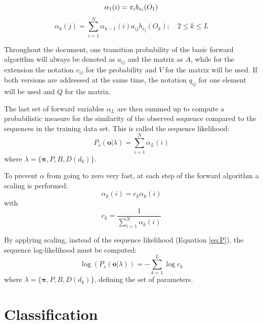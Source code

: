 \documentclass[mscthesis]{usiinfthesis}
\begin{document}
\begin{equation}
    \label{eq:forward_init_basic}
    \alpha_1(i) = \pi_{i}b_{s_i}(O_1) \\
\end{equation}
\begin{equation}
    \label{eq:forward_basic}
    \alpha_k(j) = \sum_{i=1}^{N} \alpha_{k-1}(i) a_{ij} b_{s_j}(O_k);
    \quad 2 \leq k \leq L
\end{equation}

Throughout the document, one transition probability of the basic forward
algorithm will always be denoted as $a_{ij}$ and the matrix as $A$, while for
the extension the notation $v_{ij}$ for the probability and $V$ for the matrix
will be used. If both versions are addressed at the same time, the notation
$q_{ij}$ for one element will be used and $Q$ for the matrix.

The last set of forward variables $\alpha_L$ are then summed up to compute
a probabilistic measure for the similarity of the observed sequence compared to
the sequences in the training data set. This is called the sequence likelihood:
\begin{equation}
    \label{eq:P}
    P_s(\boldsymbol{o}|\lambda) = \sum\limits_{i=1}^{N} \alpha_L(i)
\end{equation}
where $ \lambda = \{\boldsymbol{\pi}, P, B, D(d_k) \} $.

To prevent $\alpha$ from going to zero very fast, at each step of the forward
algorithm a scaling is performed:
\begin{equation}
    \label{eq:scaled}
    \alpha_k(i) = c_k \alpha_k(i)
\end{equation}
with
\begin{equation}
    \label{eq:scaling_factor}
    c_k = \frac{1}{\sum\limits_{i=1}^{N} \alpha_k(i)}
\end{equation}

By applying scaling, instead of the sequence likelihood (Equation \ref{eq:P}),
the sequence log-likelihood must be computed:
\begin{equation}
    \label{eq:Plog}
    \log(P_s(\boldsymbol{o}|\lambda)) = -\sum\limits_{k=1}^{L} \log c_k
\end{equation}
where $ \lambda = \{\boldsymbol{\pi}, P, B, D(d_k) \} $, defining the set of
parameters.

\section{Classification}
\label{ch:event_class}
\end{document}

